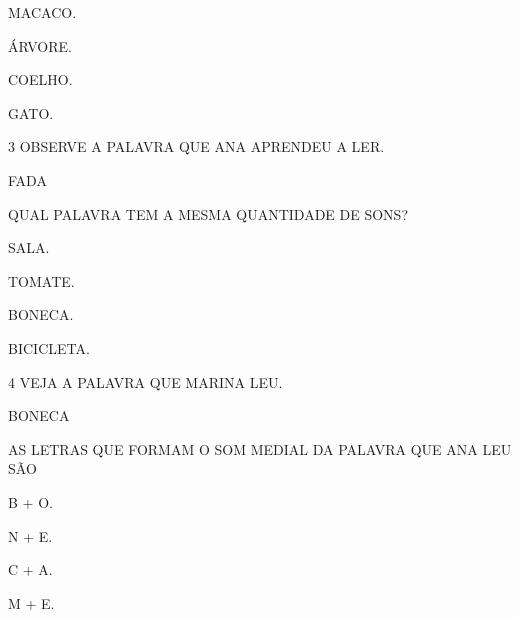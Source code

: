 \vspace{0.5cm}

\begin{multicols}{2}
\begin{escolha}[itemsep=0pt]
\item MACACO.

\item ÁRVORE.

\item COELHO.

\item GATO.
\end{escolha}
\end{multicols}

\pagebreak

\num{3} OBSERVE A PALAVRA QUE ANA APRENDEU A LER.

\begin{myquote}
\centering\large{FADA}
\end{myquote}

QUAL PALAVRA TEM A MESMA QUANTIDADE DE SONS?

\begin{multicols}{2}
\begin{escolha}[itemsep=0pt]
\item SALA.

\item TOMATE.

\item BONECA.

\item BICICLETA.
\end{escolha}
\end{multicols}

\num{4} VEJA A PALAVRA QUE MARINA LEU.

\begin{myquote}
\centering\large{BONECA}
\end{myquote}

AS LETRAS QUE FORMAM O SOM MEDIAL DA PALAVRA QUE ANA LEU SÃO

\begin{multicols}{4}
\begin{escolha}[itemsep=0pt]
\item B + O.

\item N + E.

\item C + A.

\item M + E.
\end{escolha}
\end{multicols}

